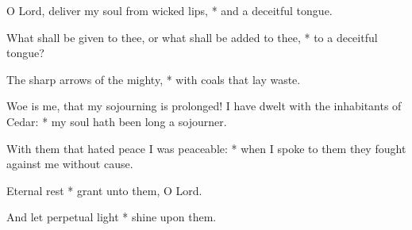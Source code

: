 \item O Lord, deliver my soul from wicked lips, * and a deceitful tongue.
\item What shall be given to thee, or what shall be added to thee, * to a deceitful tongue?
\item The sharp arrows of the mighty, * with coals that lay waste.
\item Woe is me, that my sojourning is prolonged! I have dwelt with the inhabitants of Cedar: * my soul hath been long a sojourner.
\item With them that hated peace I was peaceable: * when I spoke to them they fought against me without cause.
\item Eternal rest * grant unto them, O Lord.
\item And let perpetual light * shine upon them.
